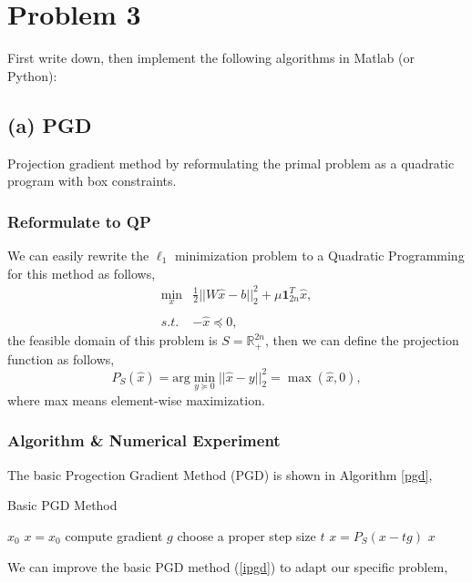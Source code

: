 \documentclass[]{article}
\begin{document}
\section{Problem 3}
First write down, then implement the following algorithms in Matlab (or Python):

\subsection{(a) PGD}
\noindent
Projection gradient method by reformulating the primal problem as a quadratic program with box constraints.
\subsubsection{Reformulate to QP}
We can easily rewrite the $\ell_1$ minimization problem to a Quadratic Programming for this method as follows,
\begin{equation}
	\begin{array}{ll}
		\min_x & \frac{1}{2} ||W\hat{x}-b||_2^2 + \mu\mathbf{1}_{2n}^T\hat{x}, \\
		&\\
		{s.t.} &  -\hat{x} \preceq 0,
	\end{array}
\end{equation}
the feasible domain of this problem is $S=\mathbb{R}_+^{2n}$, then we can define the projection function as follows,
\begin{equation}
	P_S(\hat{x}) = \text{arg}\min_{y\succeq 0}||\hat{x}-y||_2^2 = \max(\hat{x},0),
\end{equation}
where max means element-wise maximization.

\subsubsection{Algorithm \& Numerical Experiment}
The basic Progection Gradient Method (PGD) is shown in Algorithm \ref{pgd},
\begin{algorithm}[!h]
	\caption{Basic PGD Method}
	\label{pgd}
	\begin{algorithmic}
		\REQUIRE $x_0$
		\STATE $x=x_0$
		\STATE compute gradient $g$
		\STATE choose a proper step size $t$
		\STATE $x=P_S(x-tg)$
		\ENDWHILE
		\ENSURE $x$
	\end{algorithmic}
\end{algorithm}

We can improve the basic PGD method (\ref{ipgd}) to adapt our specific problem, 
\end{document}
